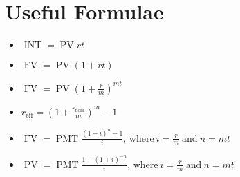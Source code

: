 \documentclass[12pt]{amsart}
\begin{document}
\section{Useful Formulae}

\begin{itemize}
  \newcommand{\INT}{\operatorname{INT}}
  \newcommand{\PV}{\operatorname{PV}}
  \newcommand{\FV}{\operatorname{FV}}
  \newcommand{\PMT}{\operatorname{PMT}}
\item
  $\INT = \PV r t$
\item
  $\FV = \PV(1 + rt)$
\item
  $\FV = \PV \left(1 + \frac{r}{m}\right)^{mt}$
\item
  $r_\text{eff} = \displaystyle{\left( 1 + \frac{r_\text{nom}}{m}\right)^m - 1}$
\item
  $\FV = \PMT \displaystyle{\frac{(1 + i)^n - 1}{i}},\, \text{where}\ i = \frac{r}{m}\ \text{and}\ n = mt$
\item
  $\PV = \PMT \displaystyle{\frac{1 - (1 + i)^{-n}}{i}},\, \text{where}\ i = \frac{r}{m}\ \text{and}\ n = mt$
\end{itemize}
\end{document}
